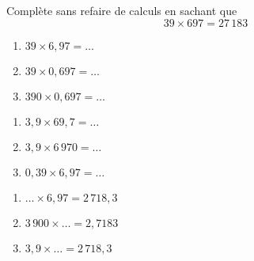Complète sans refaire de calculs en sachant que \[39\times697=27\,183\]
\begin{myenumerate}
\item
\begin{multicols}{3}
\begin{enumerate}
\item $39\times6,97=\ldots$
\item $39\times0,697=\ldots$
\item $390\times0,697=\ldots$
\end{enumerate}
\end{multicols}
\item
  \begin{multicols}{3}
  \begin{enumerate}
  \item $3,9\times69,7=\ldots$
  \item $3,9\times6\,970=\ldots$
  \item $0,39\times6,97=\ldots$
  \end{enumerate}
\end{multicols}
\item 
  \begin{multicols}{3}
    \begin{enumerate}
    \item $\ldots\times6,97=2\,718,3$
    \item $3\,900\times\ldots=2,7183$
    \item $3,9\times\ldots=2\,718,3$
    \end{enumerate}
  \end{multicols}
\end{myenumerate}


